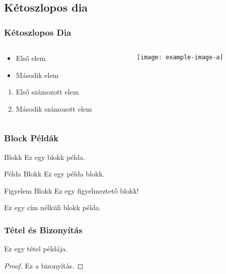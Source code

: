 \documentclass[12pt,16:9]{beamer}
\begin{document}
\subsection{Kétoszlopos dia}
\begin{frame}
    \frametitle{Kétoszlopos Dia}
    \begin{columns}
        \begin{column}{0.5\textwidth}
            \begin{itemize}
                \item Első elem
                \item Második elem
            \end{itemize}
            \begin{enumerate}
                \item Első számozott elem
                \item Második számozott elem
            \end{enumerate}
        \end{column}
        \begin{column}{0.5\textwidth}
            \texttt{[image: example-image-a]} %
            \caption{Példa kép}
        \end{column}
    \end{columns}
\end{frame}

\begin{frame}
    \frametitle{Block Példák}
    \begin{block}{Blokk}
        Ez egy blokk példa.
    \end{block}

    \begin{exampleblock}{Példa Blokk}
        Ez egy példa blokk.
    \end{exampleblock}

    \begin{alertblock}{Figyelem Blokk}
        Ez egy figyelmeztető blokk!
    \end{alertblock}

    \begin{block}{} %
        Ez egy cím nélküli blokk példa.
    \end{block}
\end{frame}

\begin{frame}
    \frametitle{Tétel és Bizonyítás}
    \begin{theorem}
        Ez egy tétel példája.
    \end{theorem}
    \begin{proof}
        Ez a bizonyítás.
    \end{proof}
\end{frame}
\end{document}
